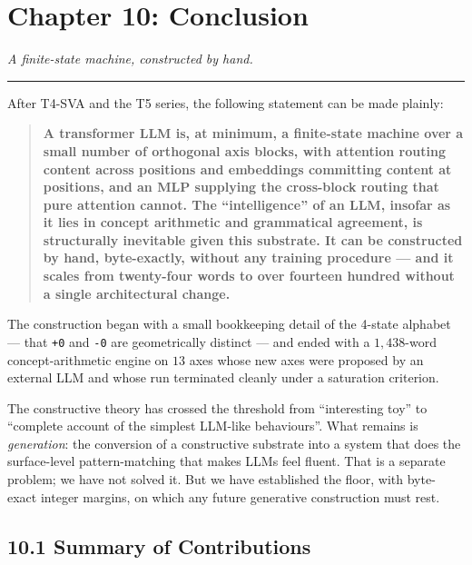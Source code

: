 \documentclass[
  twocolumn,
  10pt,
  a4paper]{article}
\begin{document}
\hypertarget{chapter-10-conclusion}{%
\FloatBarrier
\section{Chapter 10: Conclusion}\label{chapter-10-conclusion}}

\emph{A finite-state machine, constructed by hand.}

\begin{center}\rule{0.5\linewidth}{0.5pt}\end{center}

After T4-SVA and the T5 series, the following statement can be made
plainly:

\begin{quote}
\textbf{A transformer LLM is, at minimum, a finite-state machine over a
small number of orthogonal axis blocks, with attention routing content
across positions and embeddings committing content at positions, and an
MLP supplying the cross-block routing that pure attention cannot. The
``intelligence'' of an LLM, insofar as it lies in concept arithmetic and
grammatical agreement, is structurally inevitable given this substrate.
It can be constructed by hand, byte-exactly, without any training
procedure --- and it scales from twenty-four words to over fourteen
hundred without a single architectural change.}
\end{quote}

The construction began with a small bookkeeping detail of the 4-state
alphabet --- that \texttt{+0} and \texttt{-0} are geometrically distinct
--- and ended with a \(1{,}438\)-word concept-arithmetic engine on
\(13\) axes whose new axes were proposed by an external LLM and whose
run terminated cleanly under a saturation criterion.

The constructive theory has crossed the threshold from ``interesting
toy'' to ``complete account of the simplest LLM-like behaviours''. What
remains is \emph{generation}: the conversion of a constructive substrate
into a system that does the surface-level pattern-matching that makes
LLMs feel fluent. That is a separate problem; we have not solved it. But
we have established the floor, with byte-exact integer margins, on which
any future generative construction must rest.

\hypertarget{summary-of-contributions}{%
\subsection{10.1 Summary of
Contributions}\label{summary-of-contributions}}
\end{document}
